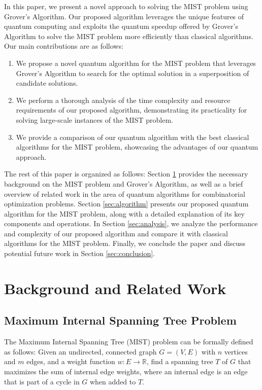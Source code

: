 In this paper, we present a novel approach to solving the MIST problem using Grover's Algorithm. Our proposed algorithm leverages the unique features of quantum computing and exploits the quantum speedup offered by Grover's Algorithm to solve the MIST problem more efficiently than classical algorithms. Our main contributions are as follows:

\begin{enumerate}
    \item We propose a novel quantum algorithm for the MIST problem that leverages Grover's Algorithm to search for the optimal solution in a superposition of candidate solutions.
    
    \item We perform a thorough analysis of the time complexity and resource requirements of our proposed algorithm, demonstrating its practicality for solving large-scale instances of the MIST problem.
    
    \item We provide a comparison of our quantum algorithm with the best classical algorithms for the MIST problem, showcasing the advantages of our quantum approach.
\end{enumerate}

The rest of this paper is organized as follows: Section \ref{sec:background} provides the necessary background on the MIST problem and Grover's Algorithm, as well as a brief overview of related work in the area of quantum algorithms for combinatorial optimization problems. Section \ref{sec:algorithm} presents our proposed quantum algorithm for the MIST problem, along with a detailed explanation of its key components and operations. In Section \ref{sec:analysis}, we analyze the performance and complexity of our proposed algorithm and compare it with classical algorithms for the MIST problem. Finally, we conclude the paper and discuss potential future work in Section \ref{sec:conclusion}.

\section{Background and Related Work} \label{sec:background}
\subsection{Maximum Internal Spanning Tree Problem}
The Maximum Internal Spanning Tree (MIST) problem can be formally defined as follows: Given an undirected, connected graph $G = (V, E)$ with $n$ vertices and $m$ edges, and a weight function $w: E \rightarrow \mathbb{R}$, find a spanning tree $T$ of $G$ that maximizes the sum of internal edge weights, where an internal edge is an edge that is part of a cycle in $G$ when added to $T$.

